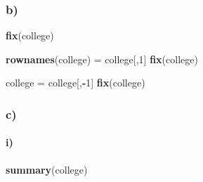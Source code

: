 \documentclass[]{article}
\newenvironment{Shaded}{\begin{snugshade}}{\end{snugshade}}
\newcommand{\KeywordTok}[1]{\textcolor[rgb]{0.13,0.29,0.53}{\textbf{#1}}}
\newcommand{\DecValTok}[1]{\textcolor[rgb]{0.00,0.00,0.81}{#1}}
\newcommand{\StringTok}[1]{\textcolor[rgb]{0.31,0.60,0.02}{#1}}
\newcommand{\OperatorTok}[1]{\textcolor[rgb]{0.81,0.36,0.00}{\textbf{#1}}}
\newcommand{\NormalTok}[1]{#1}
\let\oldparagraph\paragraph
\renewcommand{\paragraph}[1]{\oldparagraph{#1}\mbox{}}
\begin{document}
\subsubsection{b)}\label{b-2}

\begin{Shaded}
\begin{Highlighting}[]
\KeywordTok{fix}\NormalTok{(college)}

\KeywordTok{rownames}\NormalTok{(college) =}\StringTok{ }\NormalTok{college[,}\DecValTok{1}\NormalTok{]}
\KeywordTok{fix}\NormalTok{(college)}

\NormalTok{college =}\StringTok{ }\NormalTok{college[,}\OperatorTok{-}\DecValTok{1}\NormalTok{]}
\KeywordTok{fix}\NormalTok{(college)}
\end{Highlighting}
\end{Shaded}

\subsubsection{c)}\label{c-1}

\paragraph{i)}\label{i}

\begin{Shaded}
\begin{Highlighting}[]
\KeywordTok{summary}\NormalTok{(college)}
\end{Highlighting}
\end{Shaded}
\end{document}
